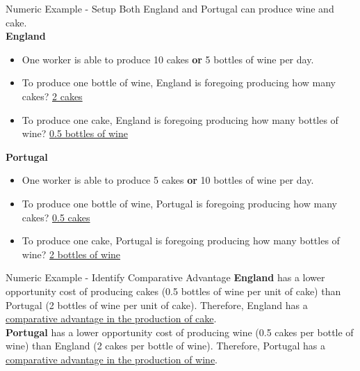 \documentclass{beamer}
\begin{document}
\begin{frame}{Numeric Example - Setup}
    Both England and Portugal can produce wine and cake. \vspace{0.1cm}\\
    \textbf{England} 
    \begin{itemize} \small
        \item One worker is able to produce 10 cakes \textbf{or} 5 bottles of wine per day.
        \item To produce one bottle of wine, England is foregoing producing how many cakes? \pause \underline{2 cakes} \pause
        \item To produce one cake, England is foregoing producing how many bottles of wine? \pause \underline{0.5 bottles of wine} \pause
    \end{itemize}
    \textbf{Portugal}
    \begin{itemize} \small
        \item One worker is able to produce 5 cakes \textbf{or} 10 bottles of wine per day. 
        \item To produce one bottle of wine, Portugal is foregoing producing how many cakes? \pause \underline{0.5 cakes} \pause
        \item To produce one cake, Portugal is foregoing producing how many bottles of wine? \pause \underline{2 bottles of wine} 
    \end{itemize} %
\end{frame}

\begin{frame}{Numeric Example - Identify Comparative Advantage}
\textbf{England} has a lower opportunity cost of producing cakes (0.5 bottles of wine per unit of cake) than Portugal (2 bottles of wine per unit of cake). Therefore, England has a \underline{comparative advantage in the production of cake}. \vspace{0.1cm} \\
\textbf{Portugal} has a lower opportunity cost of producing wine (0.5 cakes per bottle of wine) than England (2 cakes per bottle of wine). Therefore, Portugal has a \underline{comparative advantage in the production of wine}.
\end{frame}
\end{document}

